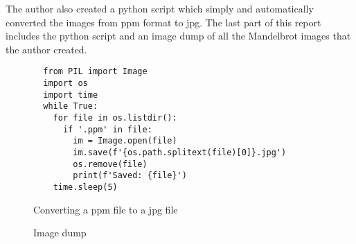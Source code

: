 \documentclass[a4paper,11pt]{article}
\begin{document}
The author also created a python script which simply and automatically converted the images from ppm format to jpg. The last part of this report includes the python script and an image dump of all the Mandelbrot images that the author created.

\begin{figure}[H]
\begin{verbatim}
  from PIL import Image
  import os
  import time
  while True:
    for file in os.listdir():
      if '.ppm' in file:
        im = Image.open(file)
        im.save(f'{os.path.splitext(file)[0]}.jpg')
        os.remove(file)
        print(f'Saved: {file}')
    time.sleep(5)
\end{verbatim}
\caption{Converting a ppm file to a jpg file}
\label{Figure:6}
\end{figure}

\begin{figure}[ht]
\centering
{}%
\qquad
{}%
\qquad
{}%
\qquad
{}%
\qquad
{}%
\qquad
{}%
\caption{Image dump}
\label{Figure:7}
\end{figure}
\end{document}
